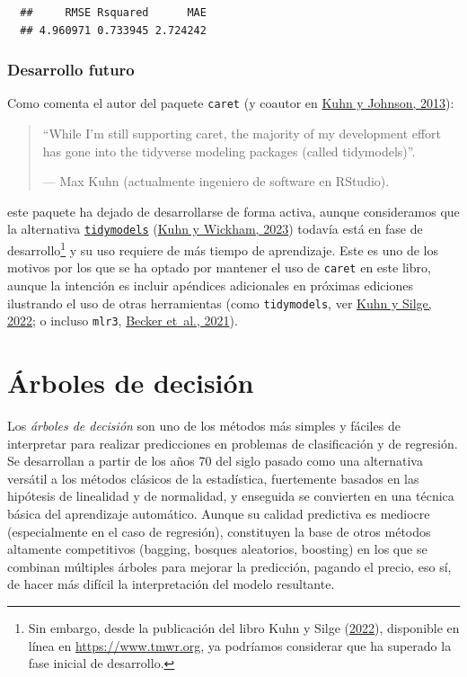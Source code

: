 \documentclass[
]{book}
\theoremstyle{break}
\theoremstyle{nonumberplain}
\begin{document}
\begin{verbatim}
  ##     RMSE Rsquared      MAE 
  ## 4.960971 0.733945 2.724242
\end{verbatim}

\hypertarget{desarrollo-futuro}{%
\subsection{Desarrollo futuro}\label{desarrollo-futuro}}

Como comenta el autor del paquete \texttt{caret} (y coautor en \protect\hyperlink{ref-kuhn2013applied}{Kuhn y Johnson, 2013}):

\begin{quote}
``While I'm still supporting caret, the majority of my development effort has gone into the tidyverse modeling packages (called tidymodels)''.

--- Max Kuhn (actualmente ingeniero de software en RStudio).
\end{quote}

este paquete ha dejado de desarrollarse de forma activa, aunque consideramos que la alternativa \href{https://www.tidymodels.org}{\texttt{tidymodels}} (\protect\hyperlink{ref-R-tidymodels}{Kuhn y Wickham, 2023}) todavía está en fase de desarrollo\footnote{Sin embargo, desde la publicación del libro Kuhn y Silge (\protect\hyperlink{ref-kuhn2022tidy}{2022}), disponible en línea en \url{https://www.tmwr.org}, ya podríamos considerar que ha superado la fase inicial de desarrollo.} y su uso requiere de más tiempo de aprendizaje.
Este es uno de los motivos por los que se ha optado por mantener el uso de \texttt{caret} en este libro, aunque la intención es incluir apéndices adicionales en próximas ediciones ilustrando el uso de otras herramientas (como \texttt{tidymodels}, ver \protect\hyperlink{ref-kuhn2022tidy}{Kuhn y Silge, 2022}; o incluso \texttt{mlr3}, \protect\hyperlink{ref-becker2021mlr3}{Becker et~al., 2021}).

\hypertarget{trees}{%
\chapter{Árboles de decisión}\label{trees}}

Los \emph{árboles de decisión} son uno de los métodos más simples y fáciles de interpretar para realizar predicciones en problemas de clasificación y de regresión.
Se desarrollan a partir de los años 70 del siglo pasado como una alternativa versátil a los métodos clásicos de la estadística, fuertemente basados en las hipótesis de linealidad y de normalidad, y enseguida se convierten en una técnica básica del aprendizaje automático.
Aunque su calidad predictiva es mediocre (especialmente en el caso de regresión), constituyen la base de otros métodos altamente competitivos (bagging, bosques aleatorios, boosting) en los que se combinan múltiples árboles para mejorar la predicción, pagando el precio, eso sí, de hacer más difícil la interpretación del modelo resultante.
\end{document}

